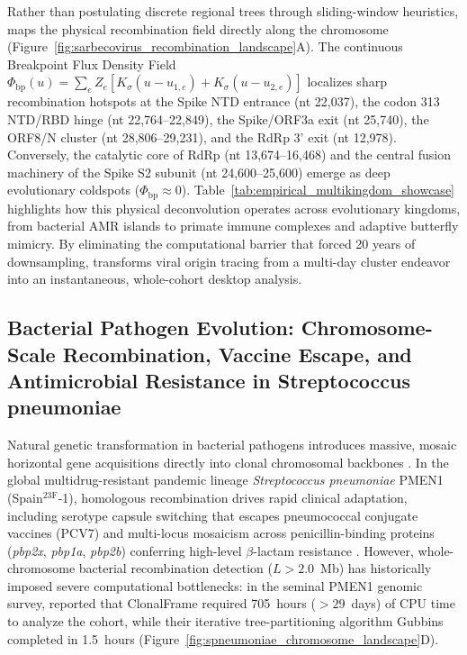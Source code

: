 Rather than postulating discrete regional trees through sliding-window heuristics, \RhizAeon maps the physical recombination field directly along the chromosome (Figure~\ref{fig:sarbecovirus_recombination_landscape}A).
The continuous Breakpoint Flux Density Field $\Phi_{\mathrm{bp}}(u) = \sum_e Z_e [K_\sigma(u - u_{1,e}) + K_\sigma(u - u_{2,e})]$ localizes sharp recombination hotspots at the Spike NTD entrance (nt 22,037), the codon 313 NTD/RBD hinge (nt 22,764--22,849), the Spike/ORF3a exit (nt 25,740), the ORF8/N cluster (nt 28,806--29,231), and the RdRp 3' exit (nt 12,978).
Conversely, the catalytic core of RdRp (nt 13,674--16,468) and the central fusion machinery of the Spike S2 subunit (nt 24,600--25,600) emerge as deep evolutionary coldspots ($\Phi_{\mathrm{bp}} \approx 0$).
Table~\ref{tab:empirical_multikingdom_showcase} highlights how this physical deconvolution operates across evolutionary kingdoms, from bacterial AMR islands to primate immune complexes and adaptive butterfly mimicry.
By eliminating the computational barrier that forced 20 years of downsampling, \RhizAeon transforms viral origin tracing from a multi-day cluster endeavor into an instantaneous, whole-cohort desktop analysis.

\subsection{Bacterial Pathogen Evolution: Chromosome-Scale Recombination, Vaccine Escape, and Antimicrobial Resistance in Streptococcus pneumoniae}
\label{subsec:spneumoniae_pmen1_reanalysis}

Natural genetic transformation in bacterial pathogens introduces massive, mosaic horizontal gene acquisitions directly into clonal chromosomal backbones \citep{croucher2011rapid,croucher2015rapid,jansen2024pneumococcal}.
In the global multidrug-resistant pandemic lineage \textit{Streptococcus pneumoniae} PMEN1 (Spain$^{23\mathrm{F}}$-1), homologous recombination drives rapid clinical adaptation, including serotype capsule switching that escapes pneumococcal conjugate vaccines (PCV7) and multi-locus mosaicism across penicillin-binding proteins (\textit{pbp2x}, \textit{pbp1a}, \textit{pbp2b}) conferring high-level $\beta$-lactam resistance \citep{croucher2011rapid}.
However, whole-chromosome bacterial recombination detection ($L > 2.0$~Mb) has historically imposed severe computational bottlenecks: in the seminal PMEN1 genomic survey, \citet{croucher2011rapid} reported that ClonalFrame required 705~hours ($>29$~days) of CPU time to analyze the cohort, while their iterative tree-partitioning algorithm Gubbins \citep{croucher2015rapid} completed in 1.5~hours (Figure~\ref{fig:spneumoniae_chromosome_landscape}D).

